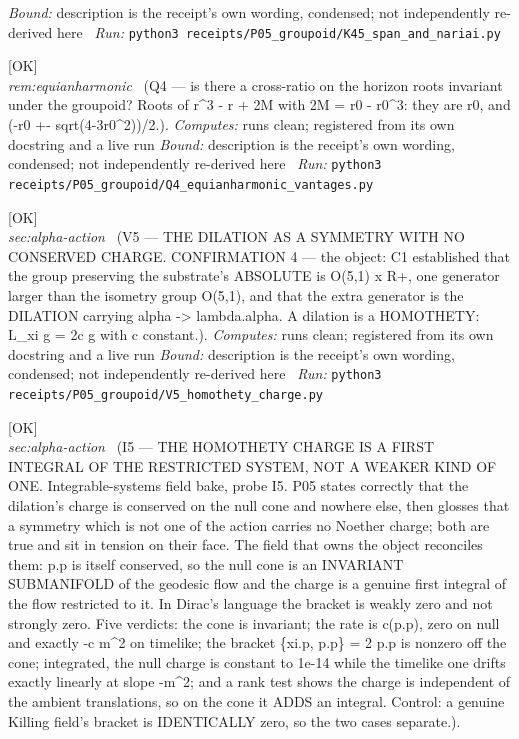 \begin{description}
 \emph{Bound:} description is the receipt's own wording, condensed; not independently re-derived here
\ \emph{Run:} \texttt{python3 receipts/P05\_groupoid/K45\_span\_and\_nariai.py}
\item[\rcptlabel{Q4_equianharmonic_vantages}{P5R10}\textbf{P5R10}\quad\texttt{Q4\_equianharmonic\_vantages}]\hfill\textsf{[OK]}\\
\textit{rem:equianharmonic} \ (Q4 --- is there a cross-ratio on the horizon roots invariant under the groupoid? Roots of r\textasciicircum{}3 - r + 2M with 2M = r0 - r0\textasciicircum{}3: they are r0, and (-r0 +- sqrt(4-3r0\textasciicircum{}2))/2.). 
\emph{Computes:} runs clean; registered from its own docstring and a live run
 \emph{Bound:} description is the receipt's own wording, condensed; not independently re-derived here
\ \emph{Run:} \texttt{python3 receipts/P05\_groupoid/Q4\_equianharmonic\_vantages.py}
\item[\rcptlabel{V5_homothety_charge}{P5R11}\textbf{P5R11}\quad\texttt{V5\_homothety\_charge}]\hfill\textsf{[OK]}\\
\textit{sec:alpha-action} \ (V5 --- THE DILATION AS A SYMMETRY WITH NO CONSERVED CHARGE. CONFIRMATION 4 --- the object: C1 established that the group preserving the substrate's ABSOLUTE is O(5,1) x R+, one generator larger than the isometry group O(5,1), and that the extra generator is the DILATION carrying alpha -> lambda.alpha. A dilation is a HOMOTHETY: L\_xi g = 2c g with c constant.). 
\emph{Computes:} runs clean; registered from its own docstring and a live run
 \emph{Bound:} description is the receipt's own wording, condensed; not independently re-derived here
\ \emph{Run:} \texttt{python3 receipts/P05\_groupoid/V5\_homothety\_charge.py}
\item[\rcptlabel{I5_the_homothety_charge_is_a_first_integral_of_the_restricted_system}{P5R12}\textbf{P5R12}\quad\texttt{I5\_the\_homothety\_charge\_is\_a\_first\_integral\_of\_the\_restricted\_system}]\hfill\textsf{[OK]}\\
\textit{sec:alpha-action} \ (I5 --- THE HOMOTHETY CHARGE IS A FIRST INTEGRAL OF THE RESTRICTED SYSTEM, NOT A WEAKER KIND OF ONE. Integrable-systems field bake, probe I5. P05 states correctly that the dilation's charge is conserved on the null cone and nowhere else, then glosses that a symmetry which is not one of the action carries no Noether charge; both are true and sit in tension on their face. The field that owns the object reconciles them: p.p is itself conserved, so the null cone is an INVARIANT SUBMANIFOLD of the geodesic flow and the charge is a genuine first integral of the flow restricted to it. In Dirac's language the bracket is weakly zero and not strongly zero. Five verdicts: the cone is invariant; the rate is c(p.p), zero on null and exactly -c m\textasciicircum{}2 on timelike; the bracket \{xi.p, p.p\} = 2 p.p is nonzero off the cone; integrated, the null charge is constant to 1e-14 while the timelike one drifts exactly linearly at slope -m\textasciicircum{}2; and a rank test shows the charge is independent of the ambient translations, so on the cone it ADDS an integral. Control: a genuine Killing field's bracket is IDENTICALLY zero, so the two cases separate.). 

\end{description}
